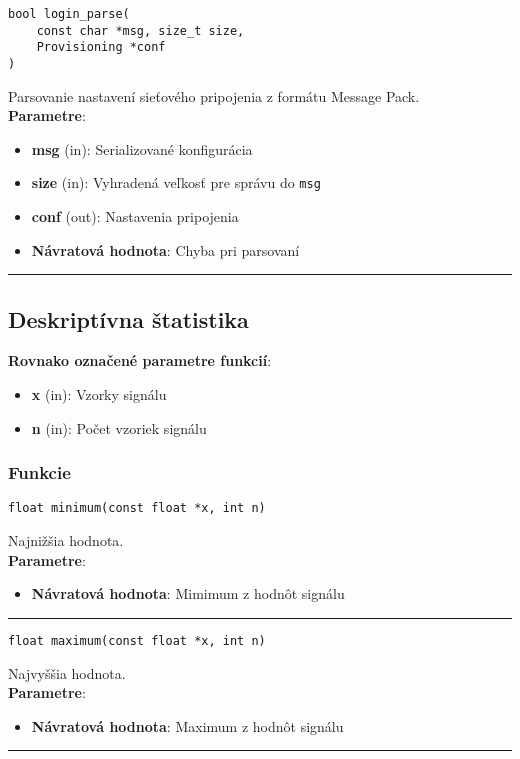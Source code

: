\begin{lstlisting}[style=docs]
bool login_parse(
	const char *msg, size_t size, 
	Provisioning *conf
)
\end{lstlisting}
Parsovanie nastavení sieťového pripojenia z formátu Message Pack. \\ 
\textbf{Parametre}:
\begin{itemize}[noitemsep, topsep=0pt]
	\item \textbf{msg} (in): Serializované konfigurácia
 	\item \textbf{size} (in): Vyhradená veľkosť pre správu do \verb|msg|
	\item \textbf{conf} (out): Nastavenia pripojenia
	\item \textbf{Návratová hodnota}: Chyba pri parsovaní
\end{itemize}
\bigbreak
\hrule


\subsection{Deskriptívna štatistika} \label{modules:statistics}

\textbf{Rovnako označené parametre funkcií}:
\begin{itemize}[noitemsep, topsep=0pt]
	\item \textbf{x} (in): Vzorky signálu
	\item \textbf{n} (in):  Počet vzoriek signálu
\end{itemize}
\newpage

\subsubsection*{Funkcie}
\begin{lstlisting}[style=docs]
float minimum(const float *x, int n)
\end{lstlisting}
Najnižšia hodnota. \\ 
\textbf{Parametre}:
\begin{itemize}[noitemsep, topsep=0pt]
	\item \textbf{Návratová hodnota}: Mimimum z hodnôt signálu
\end{itemize}
\bigbreak
\hrule

\begin{lstlisting}[style=docs]
float maximum(const float *x, int n)
\end{lstlisting}
Najvyššia hodnota. \\ 
\textbf{Parametre}:
\begin{itemize}[noitemsep, topsep=0pt]
	\item \textbf{Návratová hodnota}: Maximum z hodnôt signálu
\end{itemize}
\bigbreak
\hrule

